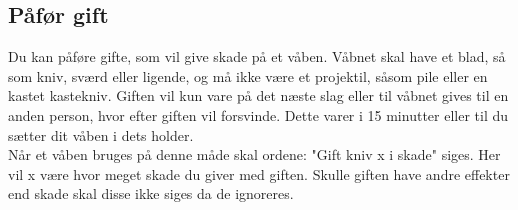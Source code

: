 \subsection{Påfør gift}
Du kan påføre gifte, som vil give skade på et våben. Våbnet skal have et blad, så som kniv, sværd eller ligende, og må ikke være et projektil, såsom pile eller en kastet kastekniv. Giften vil kun vare på det næste slag eller til våbnet gives til en anden person, hvor efter giften vil forsvinde. Dette varer i 15 minutter eller til du sætter dit våben i dets holder.\\
Når et våben bruges på denne måde skal ordene: "Gift kniv x i skade" siges. Her vil x være hvor meget skade du giver med giften. Skulle giften have andre effekter end skade skal disse ikke siges da de ignoreres.